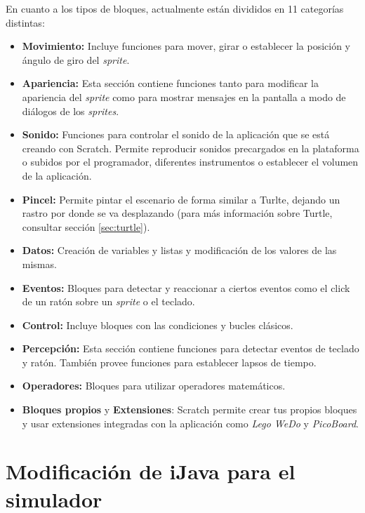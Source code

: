 En cuanto a los tipos de bloques, actualmente están divididos en 11 categorías distintas:
\begin{itemize}
	\item \textbf{Movimiento:} Incluye funciones para mover, girar o establecer la posición y ángulo de giro del \emph{sprite}.
	\item \textbf{Apariencia:} Esta sección contiene funciones tanto para modificar la apariencia del \emph{sprite} como para mostrar mensajes en la pantalla a modo de diálogos de los \emph{sprites}.
	\item \textbf{Sonido:} Funciones para controlar el sonido de la aplicación que se está creando con Scratch. Permite reproducir sonidos precargados en la plataforma o subidos por el programador, diferentes instrumentos o establecer el volumen de la aplicación.
	\item \textbf{Pincel:} Permite pintar el escenario de forma similar a Turlte, dejando un rastro por donde se va desplazando (para más información sobre Turtle, consultar sección \ref{sec:turtle}).
	\item \textbf{Datos:} Creación de variables y listas y modificación de los valores de las mismas.
	\item \textbf{Eventos:} Bloques para detectar y reaccionar a ciertos eventos como el click de un ratón sobre un \emph{sprite} o el teclado.
	\item \textbf{Control:} Incluye bloques con las condiciones y bucles clásicos.
	\item \textbf{Percepción:} Esta sección contiene funciones para detectar eventos de teclado y ratón. También provee funciones para establecer lapsos de tiempo. 
	\item \textbf{Operadores:} Bloques para utilizar operadores matemáticos.
	\item \textbf{Bloques propios} y \textbf{Extensiones}: Scratch permite crear tus propios bloques y usar extensiones integradas con la aplicación como \emph{Lego WeDo} y \emph{PicoBoard}. 
\end{itemize}



\chapter{Modificación de iJava para el simulador}
\label{anexo:ampliacion-ijava-API}

